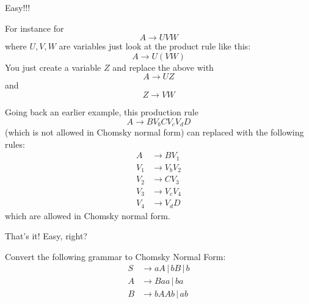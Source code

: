 Easy!!!

For instance for 
\[
A \rightarrow UVW
\]
where $U,V,W$ are variables just look at the product rule like this:
\[
A \rightarrow U(VW)
\]
You just create a variable $Z$ and replace the above with
\[
A \rightarrow UZ
\]
and
\[
Z \rightarrow VW
\]

Going back an earlier example, this production rule
\[
A \rightarrow BV_bCV_cV_dD
\] 
(which is not allowed in Chomsky normal form)
can replaced with the following rules:
\begin{align*}
A &\rightarrow BV_1 \\
V_1 &\rightarrow V_b V_2 \\
V_2 &\rightarrow C V_3 \\
V_3 &\rightarrow V_c V_4 \\
V_4 &\rightarrow V_d D
\end{align*}
which are allowed in Chomsky normal form.

That's it! Easy, right? 

\newpage

\begin{ex}
Convert the following grammar to Chomsky Normal Form:
\begin{align*}
 S &\rightarrow aA \,|\, bB \,|\, b \\
 A &\rightarrow Baa \,|\, ba \\
 B &\rightarrow bAAb \,|\, ab \\
\end{align*}
\end{ex}

